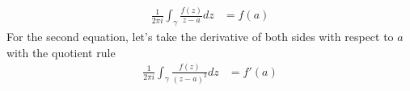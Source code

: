 \documentclass{homework}
\begin{document}
\begin{solution}
                                                                                                                                                                                                                       \begin{align}\label{cauchys-integral-formula-clean}
                                                                                                                                                                                                                       \frac{1}{2\pi i}\int_\gamma \frac{f(z)}{z-a}dz &= f(a)
                                                                                                                                                                                                                       \end{align}
                                                                                                                                                                                                                       For the second equation, let's take the derivative of both sides with respect to $a$ with the quotient rule
                                                                                                                                                                                                                       \begin{align}\label{cauchys-integral-formula-clean-d}
                                                                                                                                                                                                                       \frac{1}{2\pi i}\int_\gamma \frac{f(z)}{(z-a)^2}dz &= f'(a)
                                                                                                                                                                                                                       \end{align}
                                                                                                                                                                                                                       \end{solution}
\end{document}
